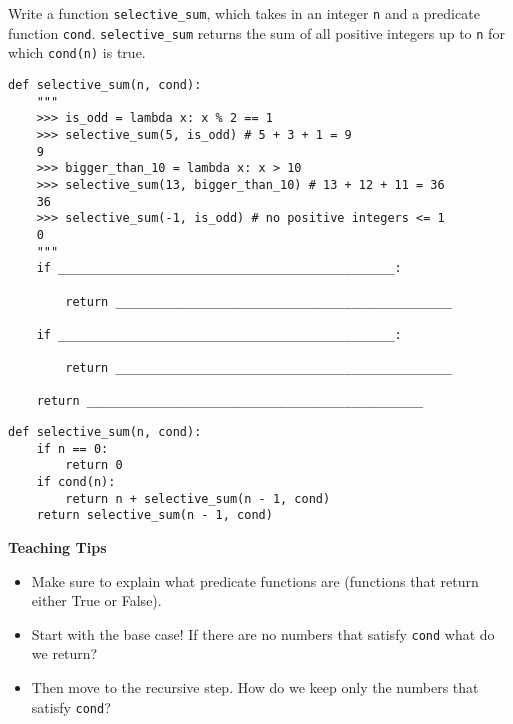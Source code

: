 \begin{blocksection}
    \question Write a function \lstinline{selective_sum}, which takes in an integer \lstinline{n} and a predicate function \lstinline{cond}. \lstinline{selective_sum} returns the sum of all positive integers up to \lstinline{n} for which \lstinline{cond(n)} is true. 
    
    \begin{lstlisting}
def selective_sum(n, cond):
    """
    >>> is_odd = lambda x: x % 2 == 1
    >>> selective_sum(5, is_odd) # 5 + 3 + 1 = 9
    9
    >>> bigger_than_10 = lambda x: x > 10
    >>> selective_sum(13, bigger_than_10) # 13 + 12 + 11 = 36
    36
    >>> selective_sum(-1, is_odd) # no positive integers <= 1
    0
    """
    if _______________________________________________:

        return _______________________________________________

    if _______________________________________________:

        return _______________________________________________

    return _______________________________________________
    \end{lstlisting}

    \begin{solution}[0.5in]
    \begin{lstlisting}
def selective_sum(n, cond):
    if n == 0:
        return 0
    if cond(n):
        return n + selective_sum(n - 1, cond)
    return selective_sum(n - 1, cond)
    \end{lstlisting}
    \end{solution}
    \begin{questionmeta}
        \textbf{Teaching Tips}
        \begin{itemize}
            \item Make sure to explain what predicate functions are (functions that return either True or False).
            \item Start with the base case! If there are no numbers that satisfy \lstinline{cond} what do we return?
            \item Then move to the recursive step. How do we keep only the numbers that satisfy \lstinline{cond}?
        \end{itemize}
      \end{questionmeta}

    \end{blocksection}
    